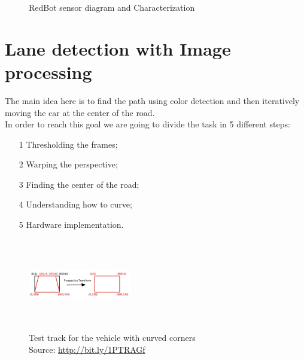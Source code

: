 \documentclass[12pt,a4paper]{article}
\begin{document}
\begin{large}
\begin{figure} [hbp]
\begin{subfigure}[b]{0.4\textwidth}
  \end{subfigure}
  \caption{RedBot sensor diagram and Characterization}
\end{figure}

\section{Lane detection with Image processing}

The main idea here is to find the path using color detection and then iteratively moving the car at the center of the road.\\
In order to reach this goal we are going to divide the task in 5 different steps:

\begin{itemize}
  \item[1] Thresholding the frames;
  \item[2] Warping the perspective;
  \item[3] Finding the center of the road;
  \item[4] Understanding how to curve;
  \item[5] Hardware implementation.
  \end{itemize}

\begin{figure}[hbp]
\centering
\includegraphics[width=0.4\textwidth, height = 4cm]{images/perspective_transform.jpg}
\caption{\label{fig:5}Test track for the vehicle with curved corners\\Source: \protect\url{http://bit.ly/1PTRAGf}}
\end{figure}


\end{large}
\end{document}
